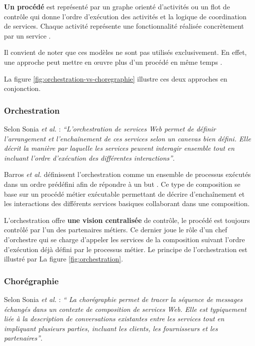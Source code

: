   \textbf{Un procédé} est représenté par un graphe orienté d'activités
  ou un flot de contrôle qui donne l'ordre d'exécution des activités
  et la logique de coordination de services. Chaque activité
  représente une fonctionnalité réalisée concrètement par un service
  \cite{chollet2009orchestration}.\medskip

  Il convient de noter que ces modèles ne sont pas utilisés
  exclusivement. En effet, une approche peut mettre en œuvre plus d'un
  procédé en même temps \cite{baryannis2010}.\medskip

  \newpage

  La figure \ref{fig:orchestration-vs-choregraphie} illustre ces deux
  approches en conjonction.

  

    \subsubsection{Orchestration}
    \label{sec:orchestration}
    Selon Sonia \emph{et al.} \cite{jamal2005environnement}:
    \emph{``L'orchestration de services Web permet de définir
      l'arrangement et l'enchaînement de ces services selon un
      canevas bien défini. Elle décrit la manière par laquelle les
      services peuvent interagir ensemble tout en incluant l'ordre
      d'exécution des différentes interactions''}.\bigskip

    Barros \emph{et al.} \cite{barros2006standards} définissent
    l'orchestration comme un ensemble de processus exécutés dans un
    ordre prédéfini afin de répondre à un but
    \cite{lopez2008selection}. Ce type de composition se base sur un
    procédé métier exécutable permettant de décrire d'enchaînement et
    les interactions des différents services basiques collaborant dans
    une composition.\medskip

    L'orchestration offre \textbf{une vision centralisée} de contrôle,
    le procédé est toujours contrôlé par l'un des partenaires
    métiers. Ce dernier joue le rôle d'un chef d'orchestre qui se
    charge d'appeler les services de la composition suivant l'ordre
    d'exécution déjà défini par le processus métier. Le principe de
    l'orchestration est illustré par La figure
    \ref{fig:orchestration}.

    \subsubsection{Chorégraphie}
    \label{sec:choregraphie-sec}
    Selon Sonia \emph{et al.} \cite{jamal2005environnement} : \emph{``
      La chorégraphie permet de tracer la séquence de messages
      échangés dans un contexte de composition de services Web. Elle
      est typiquement liée à la description de conversations
      existantes entre les services tout en impliquant plusieurs
      parties, incluant les clients, les fournisseurs et les
      partenaires''}.\bigskip

